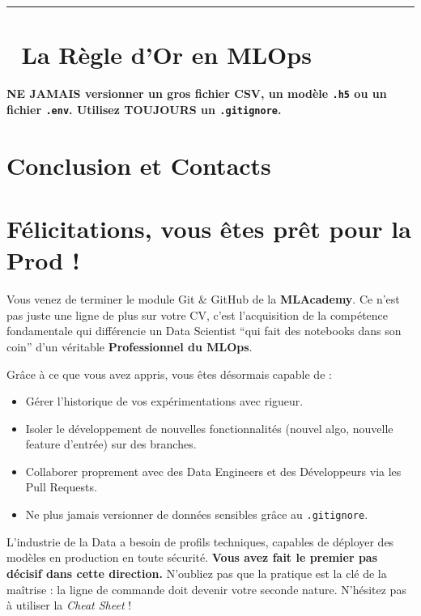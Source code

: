 \documentclass[
  letterpaper,
  DIV=11,
  numbers=noendperiod]{scrreprt}
\begin{document}
\begin{center}\rule{0.5\linewidth}{0.5pt}\end{center}


\section{🛑 La Règle d'Or en MLOps}\label{la-ruxe8gle-dor-en-mlops}

\textbf{NE JAMAIS versionner un gros fichier CSV, un modèle \texttt{.h5}
ou un fichier \texttt{.env}. Utilisez TOUJOURS un \texttt{.gitignore}.}


\section{Conclusion et Contacts}\label{conclusion-et-contacts}


\section{Félicitations, vous êtes prêt pour la Prod !
🎉}\label{fuxe9licitations-vous-uxeates-pruxeat-pour-la-prod}

Vous venez de terminer le module Git \& GitHub de la \textbf{MLAcademy}.
Ce n'est pas juste une ligne de plus sur votre CV, c'est l'acquisition
de la compétence fondamentale qui différencie un Data Scientist ``qui
fait des notebooks dans son coin'' d'un véritable \textbf{Professionnel
du MLOps}.

Grâce à ce que vous avez appris, vous êtes désormais capable de :

\begin{itemize}
\item
  Gérer l'historique de vos expérimentations avec rigueur.
\item
  Isoler le développement de nouvelles fonctionnalités (nouvel algo,
  nouvelle feature d'entrée) sur des branches.
\item
  Collaborer proprement avec des Data Engineers et des Développeurs via
  les Pull Requests.
\item
  Ne plus jamais versionner de données sensibles grâce au
  \texttt{.gitignore}.
\end{itemize}

L'industrie de la Data a besoin de profils techniques, capables de
déployer des modèles en production en toute sécurité. \textbf{Vous avez
fait le premier pas décisif dans cette direction.} N'oubliez pas que la
pratique est la clé de la maîtrise : la ligne de commande doit devenir
votre seconde nature. N'hésitez pas à utiliser la \emph{Cheat Sheet} !
\end{document}
